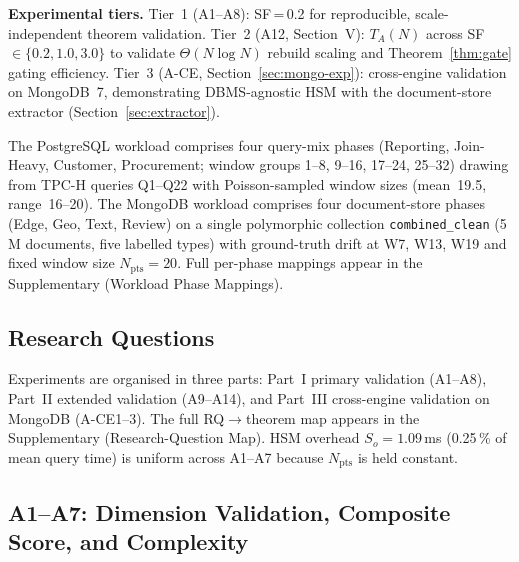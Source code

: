 \documentclass[10pt,journal,compsoc]{IEEEtran}
\newcommand{\Npts}{N_{\mathrm{pts}}}
\begin{document}
\textbf{Experimental tiers.} Tier~1 (A1--A8): SF\,=\,0.2 for
reproducible, scale-independent theorem validation. Tier~2 (A12,
Section~V): $T_A(N)$ across SF\,$\in\{0.2,1.0,3.0\}$ to validate
$\Theta(N\log N)$ rebuild scaling and Theorem~\ref{thm:gate} gating efficiency.
Tier~3 (A-CE, Section~\ref{sec:mongo-exp}): cross-engine validation on
MongoDB~7, demonstrating DBMS-agnostic HSM with the document-store
extractor (Section~\ref{sec:extractor}).

The PostgreSQL workload comprises four query-mix phases (Reporting,
Join-Heavy, Customer, Procurement; window groups 1--8, 9--16,
17--24, 25--32) drawing from TPC-H queries
Q1--Q22 with Poisson-sampled window sizes
(mean~19.5, range~16--20).
The MongoDB workload comprises four document-store phases (Edge,
Geo, Text, Review) on a single polymorphic collection
\texttt{combined\_clean} (5\,M documents, five labelled types) with
ground-truth drift at W7, W13, W19 and fixed window size
$\Npts\!=\!20$.
Full per-phase mappings appear in the Supplementary
(Workload Phase Mappings).

\subsection{Research Questions}

Experiments are organised in three parts: Part~I primary validation
(A1--A8), Part~II extended validation (A9--A14), and Part~III
cross-engine validation on MongoDB (A-CE1--3). The full
RQ$\to$theorem map appears in the Supplementary
(Research-Question Map). HSM overhead $S_o\!=\!1.09$\,ms
(0.25\,\% of mean query time) is uniform across A1--A7 because $\Npts$
is held constant.

\subsection{A1--A7: Dimension Validation, Composite Score, and Complexity}
\end{document}
